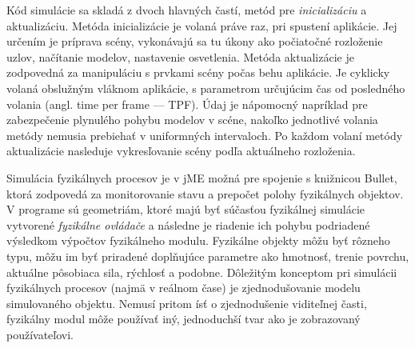 Kód simulácie sa skladá z dvoch hlavných častí, metód pre \textit{inicializáciu} a aktualizáciu. Metóda inicializácie je volaná práve raz, pri spustení aplikácie. Jej určením je príprava scény, vykonávajú sa tu úkony ako počiatočné rozloženie uzlov, načítanie modelov, nastavenie osvetlenia. Metóda aktualizácie je zodpovedná za manipuláciu s prvkami scény počas behu aplikácie. Je cyklicky volaná obslužným vláknom aplikácie, s parametrom určujúcim čas od posledného volania (angl. time per frame --- TPF). Údaj je nápomocný napríklad pre zabezpečenie plynulého pohybu modelov v scéne, nakoľko jednotlivé volania metódy nemusia prebiehať v uniformných intervaloch. Po každom volaní metódy aktualizácie nasleduje vykresľovanie scény podľa aktuálneho rozloženia.

Simulácia fyzikálnych procesov je v jME možná pre spojenie s knižnicou Bullet, ktorá zodpovedá za monitorovanie stavu a prepočet polohy fyzikálnych objektov. V programe sú geometriám, ktoré majú byť súčasťou fyzikálnej simulácie vytvorené \textit{fyzikálne ovládače} a následne je riadenie ich pohybu podriadené výsledkom výpočtov fyzikálneho modulu. Fyzikálne objekty môžu byť rôzneho typu, môžu im byť priradené doplňujúce parametre ako hmotnosť, trenie povrchu, aktuálne pôsobiaca sila, rýchlosť a podobne. Dôležitým konceptom pri simulácii fyzikálnych procesov (najmä v reálnom čase) je zjednodušovanie modelu simulovaného objektu. Nemusí pritom ísť o zjednodušenie viditeľnej časti, fyzikálny modul môže používať iný, jednoduchší tvar ako je zobrazovaný používateľovi.
